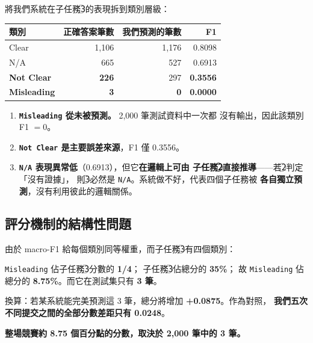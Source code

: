 \documentclass[11pt,a4paper]{ctexart}
\newcommand{\fieldname}[1]{\texttt{#1}}
\begin{document}
將我們系統在子任務\textcircled{3}的表現拆到類別層級：

\begin{table}[h]
\centering
\small
\begin{tabular}{@{}lrrr@{}}
\toprule
類別 & 正確答案筆數 & 我們預測的筆數 & F1 \\
\midrule
Clear      & 1{,}106 & 1{,}176 & 0.8098 \\
N/A        & 665     & 527     & 0.6913 \\
\rowcolor{yellow!15}
\textbf{Not Clear}  & \textbf{226} & 297 & \textbf{0.3556} \\
\rowcolor{red!10}
\textbf{Misleading} & \textbf{3}   & \textbf{0}   & \textbf{0.0000} \\
\bottomrule
\end{tabular}
\end{table}

\begin{enumerate}[leftmargin=2em, itemsep=3pt]
  \item \textbf{\fieldname{Misleading} 從未被預測。} 2{,}000 筆測試資料中一次都
        沒有輸出，因此該類別 F1 $=0$。
  \item \textbf{\fieldname{Not Clear} 是主要誤差來源}，F1 僅 0.3556。
  \item \textbf{\fieldname{N/A} 表現異常低}（0.6913），但它\textbf{在邏輯上可由
        子任務\textcircled{2}直接推導}——若\textcircled{2}判定「沒有證據」，
        則\textcircled{3}必然是 \fieldname{N/A}。系統做不好，代表四個子任務被
        \textbf{各自獨立預測}，沒有利用彼此的邏輯關係。
\end{enumerate}

\subsection{評分機制的結構性問題}
\label{sec:metric-flaw}

由於 macro-F1 給每個類別同等權重，而子任務\textcircled{3}有四個類別：

\begin{tcolorbox}[colback=red!5, colframe=red!50]
\fieldname{Misleading} 佔子任務\textcircled{3}分數的 \textbf{1/4}；
子任務\textcircled{3}佔總分的 \textbf{35\%}；
故 \fieldname{Misleading} 佔總分的 \textbf{8.75\%}。而它在測試集只有 \textbf{3 筆}。

\medskip
換算：若某系統能完美預測這 3 筆，總分將增加 \textbf{+0.0875}。作為對照，
\textbf{我們五次不同提交之間的全部分數差距只有 0.0248}。

\medskip
\textbf{整場競賽約 8.75 個百分點的分數，取決於 2{,}000 筆中的 3 筆。}
\end{tcolorbox}
\end{document}
